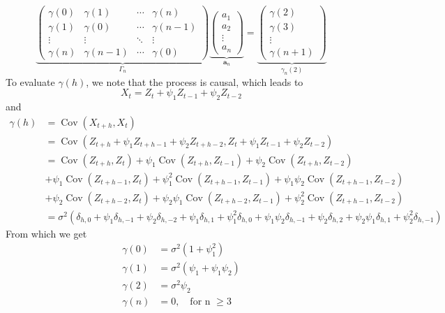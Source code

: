 \documentclass[11pt, oneside]{article}   	%
\newcommand{\Cov}{\operatorname{Cov}}
\begin{document}
 \begin{equation}
  \underbrace{
  \begin{pmatrix}
  \gamma(0) & \gamma(1) & \cdots & \gamma(n) \\
  \gamma(1) & \gamma(0) & \cdots & \gamma(n-1) \\
  \vdots  & \vdots  & \ddots & \vdots  \\
  \gamma(n) & \gamma(n-1) & \cdots & \gamma(0) 
 \end{pmatrix}
 }_{\Gamma_{n}}
 \underbrace{
  \begin{pmatrix}
 a_{1}\\
 a_{2}\\
 \vdots\\
 a_{n}
 \end{pmatrix}
 }_{\textbf{a}_{n}}
  = 
  \underbrace{
  \begin{pmatrix}
 \gamma(2)\\
 \gamma(3)\\
 \vdots\\
 \gamma(n+1)
 \end{pmatrix}
  }_{\gamma_{n}(2)}
 \end{equation}
 To evaluate $\gamma(h)$, we note that the process is causal, which leads to 
 \begin{equation}
 X_{t} = Z_{t} + \psi_{1}Z_{t-1} +\psi_{2}Z_{t-2} 
 \end{equation}
 and
 \begin{equation}
 \begin{split}
 \gamma(h) &= \Cov(X_{t+h},X_{t})\\
 &=\Cov( Z_{t+h} + \psi_{1}Z_{t+h-1} +\psi_{2}Z_{t+h-2} , Z_{t} + \psi_{1}Z_{t-1} +\psi_{2}Z_{t-2} )\\
 &=\Cov(Z_{t+h},Z_{t})+\psi_{1}\Cov(Z_{t+h},Z_{t-1})+\psi_{2}\Cov(Z_{t+h},Z_{t-2})\\
 &+\psi_{1}\Cov(Z_{t+h-1},Z_{t})+\psi_{1}^{2}\Cov(Z_{t+h-1},Z_{t-1})+\psi_{1}\psi_{2}\Cov(Z_{t+h-1},Z_{t-2}) \\
 &+\psi_{2}\Cov(Z_{t+h-2},Z_{t})+\psi_{2}\psi_{1}\Cov(Z_{t+h-2},Z_{t-1})+\psi_{2}^{2}\Cov(Z_{t+h-1},Z_{t-2}) \\
 &=\sigma^{2}(\delta_{h,0} + \psi_{1}\delta_{h,-1} + \psi_{2}\delta_{h,-2} +\psi_{1}\delta_{h,1} +\psi_{1}^{2}\delta_{h,0} + \psi_{1}\psi_{2}\delta_{h,-1}+\psi_{2}\delta_{h,2}+\psi_{2}\psi_{1}\delta_{h,1}+\psi_{2}^{2}\delta_{h,-1})
 \end{split}
 \end{equation}
 From which we get
\begin{equation}
\begin{split}
\gamma(0)&=\sigma^{2}(1+\psi_{1}^{2})\\
\gamma(1)&=\sigma^{2}(\psi_{1}+\psi_{1}\psi_{2})\\
\gamma(2)&=\sigma^{2}\psi_{2}\\
\gamma(n)&= 0 , \quad \text{for n $\geq 3$}\\\
\end{split}
 \end{equation}
 
\end{document}
